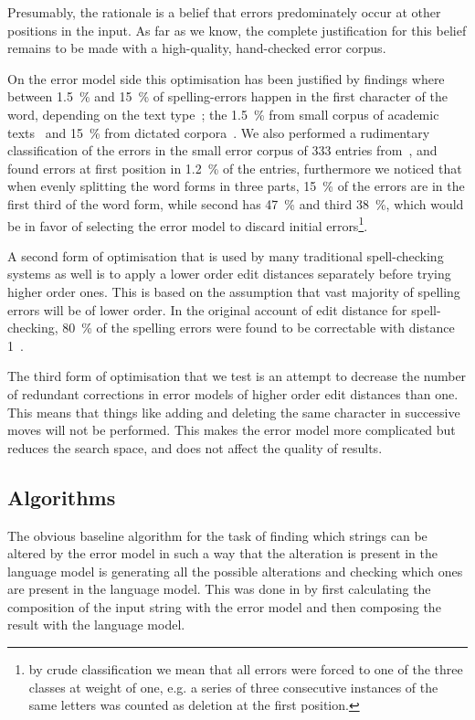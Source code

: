 \documentclass[11pt]{article}
\begin{document}
Presumably, the rationale is a belief that errors predominately occur at other
positions in the input. As far as we know, the complete justification for this
belief remains to be made with a high-quality, hand-checked error corpus.

On the error model side this optimisation has been justified by findings where
between 1.5~\% and 15~\% of spelling-errors happen in the first character of
the word, depending on the text type~\cite{Bhagat/2007};
the 1.5~\% from small corpus of academic texts~\cite{Yannakoudakis/1983}
and 15~\% from dictated corpora~\cite{Kukich/1992}. We also performed a
rudimentary classification of the errors in the small error corpus of
333 entries from~, and found errors at
first position in 1.2~\% of the entries, furthermore we noticed that
when evenly splitting the word forms in three parts, 15~\% of the errors are
in the first third of the word form, while second has 47~\% and third 38~\%,
which would be in favor of selecting the error model to discard initial
errors\footnote{by crude classification we mean that all errors were
forced to one of the three classes at weight of one, e.g. a series of
three consecutive instances of the same letters was counted as deletion at
the first position.}.

A second form of optimisation that is used by many traditional spell-checking
systems as well is to apply a lower order edit distances separately before
trying higher order ones. This is based on the assumption that vast majority
of spelling errors will be of lower order. In the original
account of edit distance for spell-checking, 80~\% of the spelling
errors were found to be correctable with distance 1~\cite{Pollock/1984}.

The third form of optimisation that we test is an attempt to decrease the
number of redundant corrections in error models of higher order edit distances
than one. This means that things like  adding and deleting the
same character in successive moves will not be performed. This makes the error
model more complicated but reduces the search space, and does not affect the
quality of results.

\subsection{Algorithms}
\label{sec:algorithms}
The obvious baseline algorithm for the task of finding which strings can be
altered by the error model in such a way that the alteration is present in the
language model is generating all the possible alterations and checking which
ones are present in the language model. This was done in 
by first calculating the composition of the input string with the error
model and then composing the result with the language model.
\end{document}
